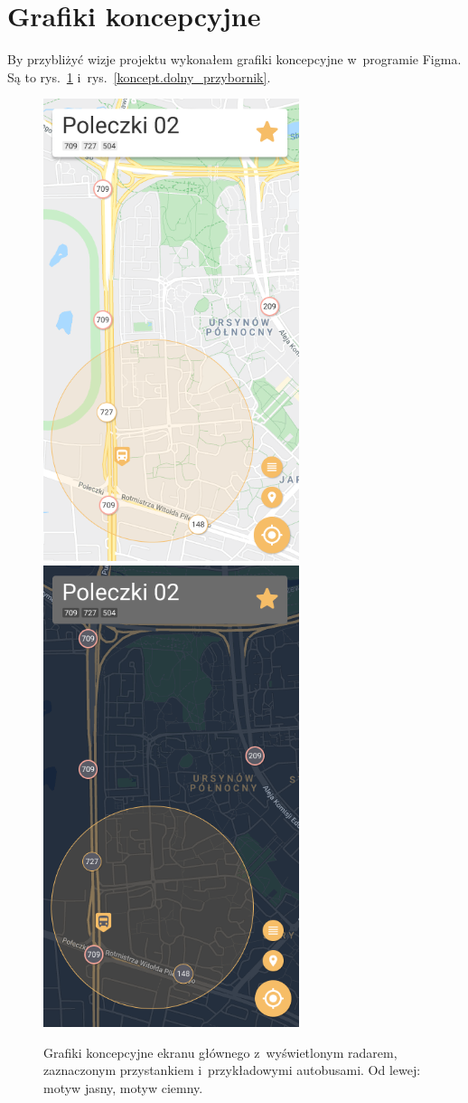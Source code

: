 \documentclass{SGGW-thesis}
\begin{document}
\section{Grafiki koncepcyjne}
By przybliżyć wizje projektu wykonałem grafiki koncepcyjne w~programie Figma.
Są to rys.~\ref{koncept.ekran_glowny} i~rys.~\ref{koncept.dolny_przybornik}.
\begin{figure}[!htb]
  \centering
  \includegraphics[width=75mm]{koncepty/screen_day_click_stop}
  \enspace
  \includegraphics[width=75mm]{koncepty/screen_night_click_stop}
  \caption[Ekran główny - koncept]{
    \label{koncept.ekran_glowny}
    Grafiki koncepcyjne ekranu głównego z~wyświetlonym radarem, zaznaczonym przystankiem i~przykładowymi autobusami. Od lewej: motyw jasny, motyw ciemny. \vspace{2ex}
  }
\end{figure}
\end{document}
